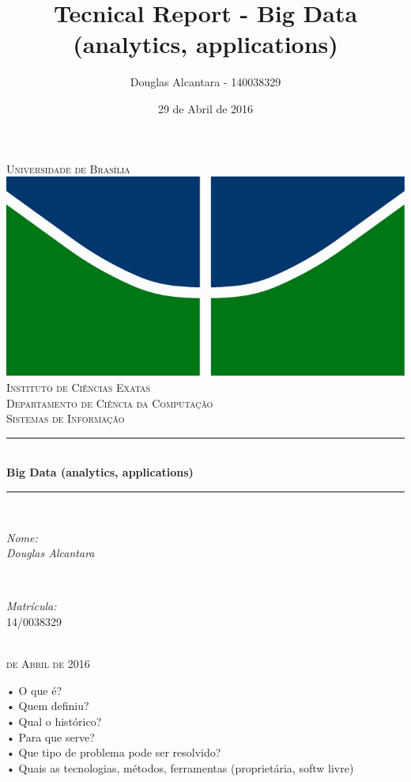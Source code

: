 \documentclass[a4paper, 12pt]{article}
\author[]{Douglas Alcantara - 140038329}
\affil[]{Sisttemas de Informação\\Universidade de Brasília}
\title{Tecnical Report - Big Data (analytics, applications) }
\date{29 de Abril de 2016}
\begin{document}
	\begin{titlepage}

		\newcommand{\HRule}{\rule{\linewidth}{0.5mm}}
		\centering
	    \textsc{\LARGE Universidade de Brasília}\\[0.5cm]
	    \includegraphics{logo.jpg}\\[0.5cm]
		\textsc{\Large Instituto de Ciências Exatas}\\[0.5cm]
	    \textsc{\Large Departamento de Ciência da Computação}\\[0.5cm]
		\textsc{\Large Sistemas de Informação}\\[0.5cm]
	    \HRule \\[0.4cm]
	    { \huge \bfseries Big Data (analytics, applications)}\\
	      \HRule \\[1.5cm]
	      	\begin{minipage}{0.4\textwidth}
	      		\begin{flushleft} \large
	      			\emph{Nome:}\\
	     			\emph{Douglas Alcantara}\\
	      		\end{flushleft}
	      	\end{minipage}
	      	~
	      	\begin{minipage}{0.4\textwidth}
	      		\begin{flushright} \large
	      			\emph{Matrícula:}\\
	     			\textsc{14/0038329}\\
	      		\end{flushright}
	      	\end{minipage}\\[2cm]
		\textsc{\large {} de Abril de 2016}\\
	\end{titlepage}
	\newpage
	\textrm{
				• O que é?\\
				• Quem definiu?\\
				• Qual o histórico?\\
				• Para que serve?\\
				• Que tipo de problema pode ser resolvido?\\
				• Quais as tecnologias, métodos, ferramentas (proprietária, softw livre)\\
			}
\end{document}
